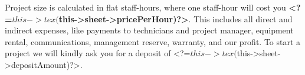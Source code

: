 
Project size is calculated in flat staff-hours, where one staff-hour
will cost you \textbf{<?=$this->tex($this->sheet->pricePerHour)?>}. This includes
all direct and indirect expenses, like payments to technicians and project 
manager, equipment rental, communications, management reserve, warranty,
and our profit. To start a project we will kindly ask you for a deposit
of <?=$this->tex($this->sheet->depositAmount)?>.
